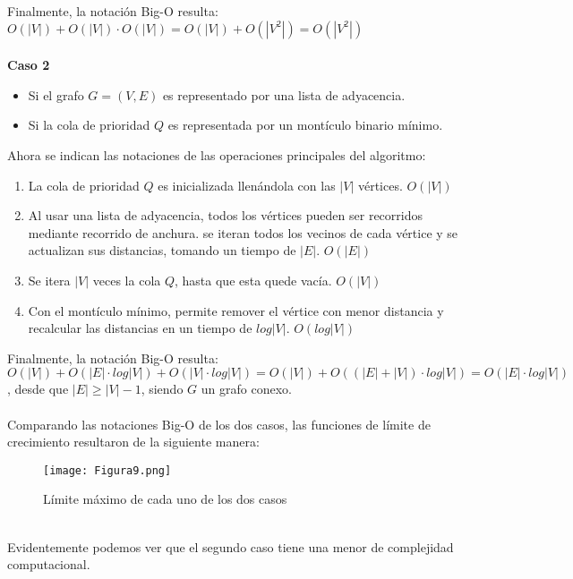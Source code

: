 \documentclass{article}
\begin{document}
Finalmente, la notación Big-O resulta: $O(|V|)+O(|V|)\cdot O(|V|)= O(|V|)+O(|V^2|)= O(|V^2|)$ \\\\
\textbf{Caso 2}
\begin{itemize}
    \item Si el grafo $G=(V,E)$ es representado por una lista de adyacencia. 
    \item Si la cola de prioridad $Q$ es representada por un montículo binario mínimo. 
\end{itemize}
Ahora se indican las notaciones de las operaciones principales del algoritmo: 
\begin{enumerate}
    \item La cola de prioridad $Q$ es inicializada llenándola con las $|V|$ vértices. \textbf{$O(|V|)$} 
    \item Al usar una lista de adyacencia, todos los vértices pueden ser recorridos mediante recorrido de anchura. se iteran todos los vecinos de cada vértice y se actualizan sus distancias, tomando un tiempo de $|E|$. \textbf{$O(|E|)$} 
    \item Se itera $|V|$ veces la cola $Q$, hasta que esta quede vacía. \textbf{$O(|V|)$} 
    \item Con el montículo mínimo, permite remover el vértice con menor distancia y recalcular las distancias en un tiempo de $log|V|$. \textbf{$O(log|V|)$} 
\end{enumerate}
Finalmente, la notación Big-O resulta: $O(|V|)+O(|E|\cdot log|V|)+O(|V|\cdot log|V|)= O(|V|)+O((|E|+|V|)\cdot log|V|)=O(|E|\cdot log|V|)$, desde que $|E|\geq |V|-1$, siendo $G$ un grafo conexo. 
\\\\
Comparando las notaciones Big-O de los dos casos, las funciones de límite de crecimiento resultaron de la siguiente manera:
\\
\begin{figure}[h]
    \centering
    \texttt{[image: Figura9.png]}
    \caption{Límite máximo de cada uno de los dos casos}
    \label{fig:9}
\end{figure}
\\
Evidentemente podemos ver que el segundo caso tiene una menor de complejidad computacional.
\end{document}
